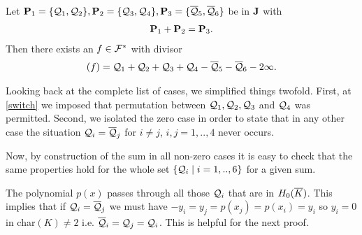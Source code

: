 \documentclass[english,11pt,a4paper]{article}
\begin{document}
\begin{theorem}\label{hhs}
  Let $\P_1 = \{ \q_1, \q_2 \}, \P_2 = \{ \q_3, \q_4 \}, \P_3 = \{ \bar \q_5, \bar \q_6 \}$ be in $\J$ with
  \begin{align*}
    \P_1 + \P_2 = \P_3.
  \end{align*}
  Then there exists an $f \in \F^*$ with divisor
  \begin{align*}
    (f) = \q_1 + \q_2 + \q_3 + \q_4 - \bar \q_5 - \bar \q_6 - 2 \infty.
  \end{align*}
\end{theorem}

\begin{remark}
  Looking back at the complete list of cases, we simplified things twofold. First, at \eqref{switch} we imposed that permutation between $\q_1, \q_2, \q_3$ and $\q_4$ was permitted. Second, we isolated the zero case in order to state that in any other case the situation $\q_i = \bar \q_j$ for $i \neq j$, $i, j = 1,..,4$ never occurs.

  Now, by construction of the sum in all non-zero cases it is easy to check that the same properties hold for the whole set $\{ \q_i \mid i = 1,..,6 \}$ for a given sum.

  The polynomial $p(x)$ passes through all those $\q_i$ that are in $\enkb$. This implies that if $\q_i = \bar \q_j$ we must have $-y_i = y_j = p(x_j) = p(x_i) = y_i$ so $y_i = 0$ in char$(K) \neq 2$ i.e. $\bar \q_i =\q_j = \q_i$. This is helpful for the next proof.
\end{remark}
\end{document}
